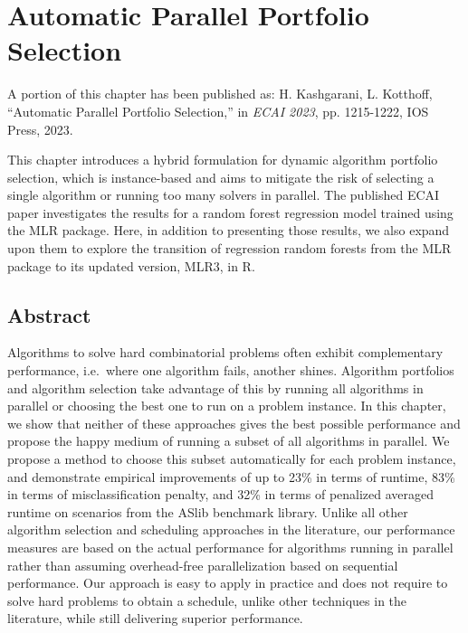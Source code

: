 
\chapter{Automatic Parallel Portfolio Selection}

A portion of this chapter has been published as: H. Kashgarani, L. Kotthoff, “Automatic Parallel Portfolio Selection,” in \textit{ECAI 2023}, pp. 1215-1222, IOS Press, 2023.

This chapter introduces a hybrid formulation for dynamic algorithm portfolio selection, which is instance-based and aims to mitigate the risk of selecting a single algorithm or running too many solvers in parallel. The published ECAI paper investigates the results for a random forest regression model trained using the MLR package. Here, in addition to presenting those results, we also expand upon them to explore the transition of regression random forests from the MLR package to its updated version, MLR3, in R.

\section{Abstract}
Algorithms to solve hard combinatorial problems often exhibit complementary performance, i.e.\ where one algorithm fails, another shines. Algorithm portfolios and algorithm selection take advantage of this by running all algorithms in parallel or choosing the best one to run on a problem instance. In this chapter, we show that neither of these approaches gives the best possible performance and propose the happy medium of running a subset of all algorithms in parallel. We propose a method to choose this subset automatically for each problem instance, and demonstrate empirical improvements of up to 23\% in terms of runtime, 83\% in terms of misclassification penalty, and 32\% in terms of penalized averaged runtime on scenarios from the ASlib benchmark library. Unlike all other algorithm selection and scheduling approaches in the literature, our performance measures are based on the actual performance for algorithms running in parallel rather than assuming overhead-free parallelization based on sequential performance. Our approach is easy to apply in practice and does not require to solve hard problems to obtain a schedule, unlike other techniques in the literature, while still delivering superior performance.

